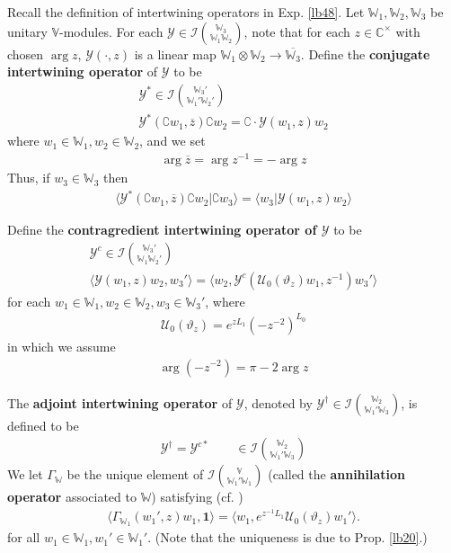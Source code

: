 \documentclass[11pt,b5paper,notitlepage]{article}
\theoremstyle{definition}
\newtheorem{rem}[df]{Remark}
\theoremstyle{plain}
\newcommand{\mc}{\mathcal}
\newcommand{\ovl}{\overline}
\newcommand{\id}{\mathbf{1}}
\newcommand{\bk}[1]{\langle {#1}\rangle}
\newcommand{\bigbk}[1]{\big\langle {#1}\big\rangle}
\newcommand{\Co}{\complement}
\newcommand{\Vbb}{\mathbb V}
\newcommand{\Wbb}{\mathbb W}
\newcommand{\Cbb}{\mathbb C}
\numberwithin{equation}{section}
\begin{document}
Recall the definition of intertwining operators in Exp. \ref{lb48}. Let $\Wbb_1,\Wbb_2,\Wbb_3$ be unitary $\Vbb$-modules. For each $\mc Y\in\mc I{\Wbb_3\choose\Wbb_1\Wbb_2}$, note that for each $z\in\Cbb^\times$ with chosen $\arg z$, $\mc Y(\cdot,z)$ is a linear map $\Wbb_1\otimes\Wbb_2\rightarrow\ovl{\Wbb_3}$. Define the \textbf{conjugate intertwining operator} of $\mc Y$ to be 
\begin{gather*}
\mc Y^*\in\mc I{\Wbb_3'\choose\Wbb_1'\Wbb_2'}\\
\mc Y^*(\Co w_1,\ovl z)\Co w_2=\Co\cdot \mc Y(w_1,z)w_2
\end{gather*}
where $w_1\in\Wbb_1,w_2\in\Wbb_2$, and we set
\begin{align}
\arg\ovl z=\arg z^{-1}=-\arg z  \label{eq92}
\end{align}
Thus, if $w_3\in\Wbb_3$ then
\begin{align}
\bk{\mc Y^*(\Co w_1,\ovl z)\Co w_2|\Co w_3}=\bk{w_3|\mc Y(w_1,z)w_2}\label{eq84}
\end{align}

Define the \textbf{contragredient intertwining operator of $\mc Y$} to be  \index{Y@$\mc Y^*,\mc Y^c$} 
\begin{gather}
\mc Y^c\in\mc I{\Wbb_3'\choose \Wbb_1\Wbb_2'}\nonumber \\
\bk{\mc Y(w_1,z)w_2,w_3'}=\bk{w_2,\mc Y^c(\mc U_0(\vartheta_z)w_1,z^{-1})w_3'} \label{eq85}
\end{gather}
for each $w_1\in\Wbb_1,w_2\in\Wbb_2,w_3\in\Wbb_3'$, where
\begin{align}
\mc U_0(\vartheta_z)=e^{zL_1}(-z^{-2})^{L_0}  \label{eq77}
\end{align}
in which we assume
\begin{align}
\arg (-z^{-2})=\pi-2\arg z  \label{eq78}
\end{align}





The \textbf{adjoint intertwining operator} of $\mc Y$, denoted by $\mc Y^\dagger\in\mc I{\Wbb_2\choose \Wbb_1'\Wbb_3}$, \index{Y@$\mc Y^\dagger$} is defined to be
\begin{align*}
\mc Y^\dagger=\mc Y^{c*}\qquad\in \mc I{\Wbb_2\choose \Wbb_1'\Wbb_3}
\end{align*}
We let $\Gamma_\Wbb$ \index{zz@$\Gamma_\Wbb$} be the unique element of $\mc I{\Vbb\choose \Wbb_1'\Wbb_1}$ (called the \textbf{annihilation operator} associated to $\Wbb$) satisfying (cf. \cite[(1.40)]{Gui19a})
\begin{align}
\bigbk{\Gamma_{\Wbb_1}(w_1',z)w_1,\id}=\bigbk{w_1,e^{z^{-1}L_1}\mc U_0(\vartheta_z)w_1' }. \label{eq83}
\end{align}
for all $w_1\in\Wbb_1,w_1'\in\Wbb_1'$. (Note that the uniqueness is due to Prop. \ref{lb20}.)
\end{document}
